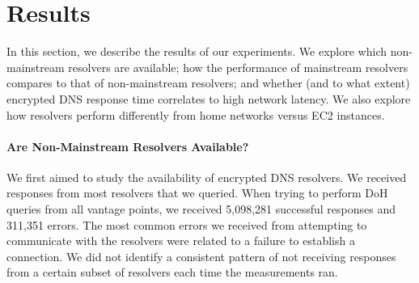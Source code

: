 \section{Results}\label{sec:results} 

In this section, we describe the results of our experiments.  We explore which
non-mainstream resolvers are available; how
the performance of mainstream resolvers compares to that of non-mainstream
resolvers; and whether (and to what extent) encrypted DNS response time
correlates to high network latency. We also explore how resolvers perform 
differently from home networks versus EC2 instances. 

\paragraph{Are Non-Mainstream Resolvers Available?}
We first aimed to study the availability of encrypted DNS
resolvers. 
We received responses from most resolvers that we queried. When trying to perform DoH queries from all vantage points,
we received 5,098,281 successful responses and 311,351 errors. 
The most common errors we received from attempting to communicate with
the resolvers were related to a failure to establish a connection.
We did not identify a consistent pattern of not receiving responses from a certain
subset of resolvers each time the measurements ran. 


